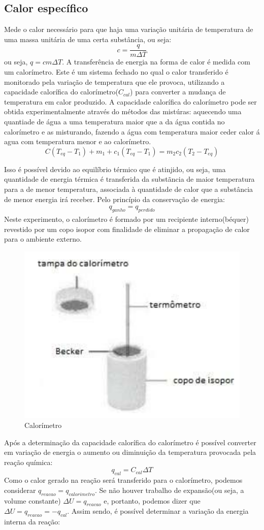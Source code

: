 \documentclass{article}
\begin{document}
\subsection{Calor específico}
Mede o calor necessário para que haja uma variação unitária de temperatura de uma massa unitária de uma certa substância, ou seja:
\begin{equation}
  c=\frac{q}{m\Delta T }
  \label{eq:eqCalorEspecifico}
\end{equation}
ou seja, $q=cm\Delta T$. A transferência de energia na forma de calor é medida com um calorímetro. Este é um sistema fechado no qual o calor transferido é monitorado pela variação de temperatura que ele provoca, utilizando a capacidade calorífica do calorímetro($C_{cal}$) para converter a mudança de temperatura em calor produzido.
A capacidade calorífica do calorímetro pode ser obtida experimentalmente através do métodos das mistúras: aquecendo uma quantiade de água a uma temperatura maior que a da água contida no calorímetro e as misturando, fazendo a água com temperatura maior ceder calor á agua com temperatura menor e ao calorímetro.
\begin{equation}
  C(T_{eq}-T_1)+m_1+c_1(T_{eq}-T_1)=m_2c_2(T_2-T_{eq})
\end{equation}

Isso é possível devido ao equilíbrio térmico que é atinjido, ou seja, uma quantidade de energia térmica é transferida da substãncia de maior temperatura para a de menor temperatura, associada à quantidade de calor que a substância de menor energia irá receber. Pelo princípio da conservação de energia:
\begin{align}
  q_{ganho}=q_{perdido}
\end{align}
\newpage
Neste experimento, o calorímetro é formado por um recipiente interno(béquer) revestido por um copo isopor com finalidade de eliminar a propagação de calor para o ambiente externo.
\begin{figure}[!h]
  \centering
  \includegraphics[width=0.2\linewidth]{calorimetro.png}
  \caption{Calorímetro}
  \label{fig:Calorimetro}
\end{figure}
Após a determinação da capacidade calorífica do calorímetro é possível converter em variação de energia o aumento ou diminuição da temperatura provocada pela reação química:
\begin{equation}
  q_{cal}=C_{cal}\Delta T
  \label{eq:eqCalorimetro1}
\end{equation}
Como o calor gerado na reação será transferido para o calorímetro, podemos considerar $q_{reacao}=q_{calorimetro}$. Se não houver trabalho de expansão(ou seja, a volume constante) $\Delta U = q_{reacao}$ e, portanto, podemos dizer que $\Delta U = q_{reacao} = -q_{cal}$. Assim sendo, é possível determinar a variação da energia interna da reação:
\end{document}
